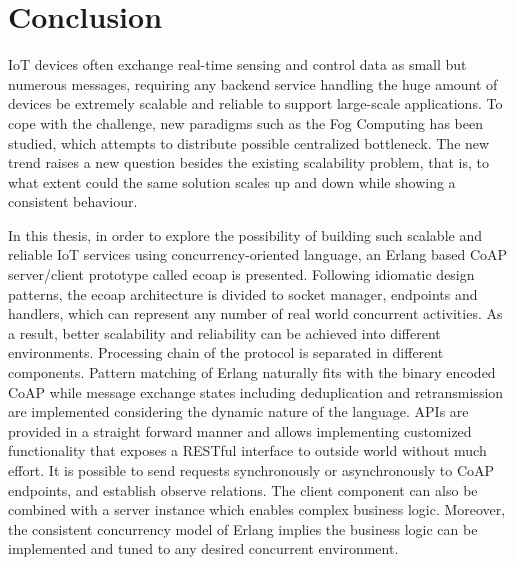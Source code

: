 \chapter{Conclusion}\label{ch6}

IoT devices often exchange real-time sensing and control data as small but numerous messages, requiring any backend service handling the huge amount of devices be extremely scalable and reliable to support large-scale applications. To cope with the challenge, new paradigms such as the Fog Computing has been studied, which attempts to distribute possible centralized bottleneck. The new trend raises a new question besides the existing scalability problem, that is, to what extent could the same solution scales up and down while showing a consistent behaviour. 

In this thesis, in order to explore the possibility of building such scalable and reliable IoT services using concurrency-oriented language, an Erlang based CoAP server/client prototype called ecoap is presented. Following idiomatic design patterns, the ecoap architecture is divided to socket manager, endpoints and handlers, which can represent any number of real world concurrent activities. As a result, better scalability and reliability can be achieved into different environments. Processing chain of the protocol is separated in different components. Pattern matching of Erlang naturally fits with the binary encoded CoAP while message exchange states including deduplication and retransmission are implemented considering the dynamic nature of the language. APIs are provided in a straight forward manner and allows implementing customized functionality that exposes a RESTful interface to outside world without much effort. It is possible to send requests synchronously or asynchronously to CoAP endpoints, and establish observe relations. The client component can also be combined with a server instance which enables complex business logic. Moreover, the consistent concurrency model of Erlang implies the business logic can be implemented and tuned to any desired concurrent environment.

